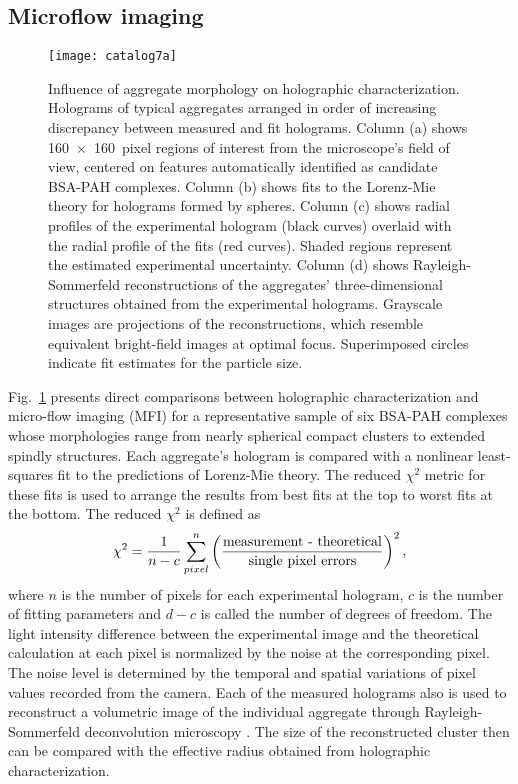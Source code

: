 \subsection{Microflow imaging}
\label{sec:morphology}

\begin{figure}[!t]
  \centering
  \texttt{[image: catalog7a]}
\end{figure}
\begin{figure}[!t]
	\caption[Influence of aggregate morphology on holographic
    characterization]
    {Influence of aggregate morphology on holographic
    characterization.  Holograms of typical aggregates arranged in
    order of increasing discrepancy between measured and fit
    holograms.  Column (a) shows \SI{160 x 160}{pixel}
    regions of interest from the microscope's field of view, centered
    on features automatically identified as candidate BSA-PAH complexes.
    Column (b) shows fits to the Lorenz-Mie theory for
    holograms formed by spheres.  Column (c) shows radial
    profiles of the experimental hologram (black curves) overlaid with the
    radial profile of the fits (red curves).  Shaded regions represent
    the estimated experimental uncertainty.
    Column (d) shows Rayleigh-Sommerfeld reconstructions of the aggregates'
    three-dimensional structures obtained from the experimental
    holograms.  Grayscale images are projections of the
    reconstructions, which resemble equivalent bright-field images at
    optimal focus.  Superimposed circles indicate fit estimates for
    the particle size.}
	\label{fig:morphology}
\end{figure}

Fig.~\ref{fig:morphology} presents direct comparisons between holographic 
characterization and micro-flow imaging (MFI) for a representative sample 
of six BSA-PAH complexes whose morphologies range from nearly spherical 
compact clusters to extended spindly structures.
Each aggregate's hologram is compared with a
nonlinear least-squares fit to the predictions of Lorenz-Mie theory.  
The reduced $\chi^2$ metric for these fits is used to arrange the results from 
best fits at the top to worst fits at the bottom.
The reduced $\chi^2$ is defined as \cite{taylor97}
\begin{equation}
\chi^2=\frac{1}{n-c} \sum_{pixel}^{n} \left( \frac{\textnormal{measurement -
      theoretical}}{\textnormal{single\ pixel\ errors}} \right)^2,
\end{equation}
where $n$ is the number of pixels for each experimental hologram, $c$ is the number of 
fitting parameters and $d-c$ is called the number of degrees of freedom. The light 
intensity difference between the experimental image and the theoretical calculation at 
each pixel is normalized by the noise at the corresponding pixel. The noise level is 
determined by the temporal and spatial variations of pixel values recorded from the 
camera.
Each of the measured holograms also is used to reconstruct a
volumetric image of the individual aggregate through
Rayleigh-Sommerfeld deconvolution microscopy \cite{dixon11a}. The size of the reconstructed cluster then can be compared with the effective radius obtained from holographic characterization.

